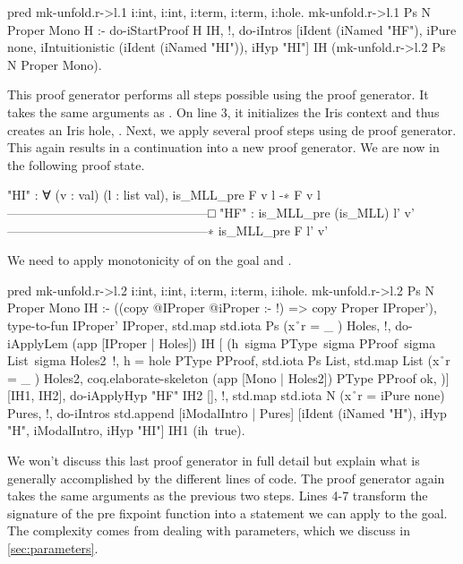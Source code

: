\documentclass[thesis.tex]{subfiles}
\begin{document}
\begin{elpicode}
  pred mk-unfold.r->l.1 i:int, i:int, 
                        i:term, i:term, i:hole.
  mk-unfold.r->l.1 Ps N Proper Mono H :-
    do-iStartProof H IH, !,
    do-iIntros [iIdent (iNamed "HF"), iPure none, 
                iIntuitionistic (iIdent (iNamed "HI")), 
                iHyp "HI"] IH 
               (mk-unfold.r->l.2 Ps N Proper Mono).
\end{elpicode}
This proof generator performs all steps possible using the  proof generator. It takes the same arguments as . On line 3, it initializes the Iris context and thus creates an Iris hole, . Next, we apply several proof steps using de  proof generator. This again results in a continuation into a new proof generator. We are now in the following proof state.
\begin{coqcode}
  "HI" : ∀ (v : val) (l : list val), 
          is_MLL_pre F v l -∗ F v l
  ------------------------------------------------□
  "HF" : is_MLL_pre (is_MLL) l' v'
  ------------------------------------------------∗
  is_MLL_pre F l' v'
\end{coqcode}
We need to apply monotonicity of  on the goal and .
\begin{elpicode}
  pred mk-unfold.r->l.2 i:int, i:int, 
                           i:term, i:term, i:ihole.
  mk-unfold.r->l.2 Ps N Proper Mono IH :-
    ((copy {{ @IProper }} {{ @iProper }} :- !) => 
      copy Proper IProper'),
    type-to-fun IProper' IProper,
    std.map {std.iota Ps} (x\r\ r = {{ _ }}) Holes, !,
    do-iApplyLem (app [IProper | Holes]) IH [
      (h\ sigma PType\ sigma PProof\ 
          sigma List\ sigma Holes2\ !,
        h = hole PType PProof,
        std.iota Ps List,
        std.map List (x\r\ r = {{ _ }}) Holes2,
        coq.elaborate-skeleton (app [Mono | Holes2]) 
                               PType PProof ok,
    )] [IH1, IH2],
    do-iApplyHyp "HF" IH2 [], !,
    std.map {std.iota N} (x\r\ r = iPure none) Pures, !,
    do-iIntros 
      {std.append [iModalIntro | Pures] 
                  [iIdent (iNamed "H"), iHyp "H", 
                   iModalIntro, iHyp "HI"]} 
      IH1 (ih\ true).
\end{elpicode}
We won't discuss this last proof generator in full detail but explain what is generally accomplished by the different lines of code. The proof generator again takes the same arguments as the previous two steps.
Lines 4-7 transform the signature of the pre fixpoint function into a statement we can apply to the goal. The complexity comes from dealing with parameters, which we discuss in \cref{sec:parameters}.
\end{document}
